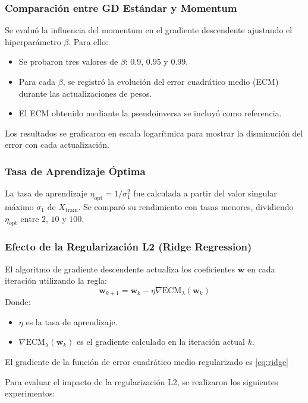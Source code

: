 \documentclass{tp02}
\begin{document}
\subsubsection{Comparación entre GD Estándar y Momentum}
Se evaluó la influencia del momentum en el gradiente descendente 
ajustando el hiperparámetro $\beta$. Para ello:
\begin{itemize}
    \item Se probaron tres valores de $\beta$: $0.9$, $0.95$ y $0.99$.
    \item Para cada $\beta$, se registró la evolución del error 
    cuadrático medio (ECM) durante las actualizaciones de pesos.
    \item El ECM obtenido mediante la pseudoinversa se incluyó como 
    referencia.
\end{itemize}
Los resultados se graficaron en escala logarítmica para mostrar la 
disminución del error con cada actualización.

\subsubsection{Tasa de Aprendizaje Óptima}
La tasa de aprendizaje $\eta_{\text{opt}} = 1/\sigma_1^2$ fue calculada 
a partir del valor singular máximo $\sigma_1$ de $X_{\text{train}}$. 
Se comparó su rendimiento con tasas menores, dividiendo 
$\eta_{\text{opt}}$ entre $2$, $10$ y $100$.

\subsubsection{Efecto de la Regularización L2 (Ridge Regression)}

El algoritmo de gradiente descendente actualiza los coeficientes \(\mathbf{w}\) en cada iteración utilizando la regla:
\begin{equation}
\mathbf{w}_{k+1} = \mathbf{w}_k - \eta \nabla \text{ECM}_\lambda(\mathbf{w}_k)
\end{equation}
Donde:
\begin{itemize}
    \item \(\eta\) es la tasa de aprendizaje.
    \item \(\nabla \text{ECM}_\lambda(\mathbf{w}_k)\) es el gradiente calculado en la iteración actual \(k\).
\end{itemize}

El gradiente de la función de error cuadrático medio regularizado es
\ref{eq:ridge}


Para evaluar el impacto de la regularización L2, se realizaron los 
siguientes experimentos:
\end{document}

